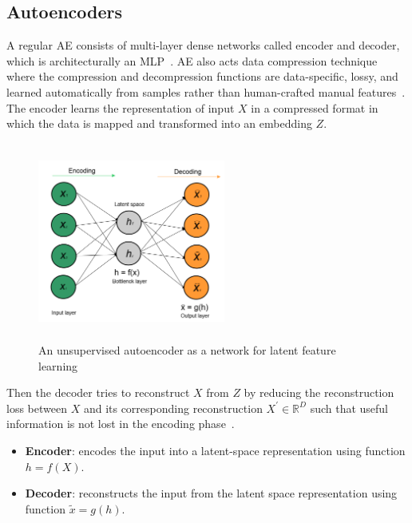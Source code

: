 \subsection{Autoencoders}
\label{preli:AEs}
A regular AE consists of multi-layer dense networks called encoder and decoder, which is architecturally an MLP~\cite{karimDLTF2018}. AE also acts data compression technique where the compression and decompression functions are data-specific, lossy, and learned automatically from samples rather than human-crafted manual features~\cite{karimDLTF2018}. The encoder learns the representation of input $X$ in a compressed format in which the data is mapped and transformed into an embedding $Z$.  

\begin{figure}[h]
    \centering
    \includegraphics[width=0.55\textwidth,height=65mm]{images/ae.png}
    \caption{An unsupervised autoencoder as a network for latent feature learning~\cite{karimDLTF2018}}
    \label{fig:ae_theory1}
    \vspace{-2mm}
\end{figure}

\hspace*{3.5mm} Then the decoder tries to reconstruct $X$ from $Z$ by reducing the reconstruction loss between $X$ and its corresponding reconstruction $X^{\prime} \in \mathbb{R}^{D}$ such that useful information is not lost in the encoding phase~\cite{KarimIEEEAccess2019}.

\vspace{-2mm}
\begin{itemize}[noitemsep]
    \item \textbf{Encoder}: encodes the input into a latent-space representation using function $h = f(X)$.
    \item \textbf{Decoder}: reconstructs the input from the latent space representation using function $\tilde{x} = g(h)$. 
\end{itemize}
\vspace{-2mm}

